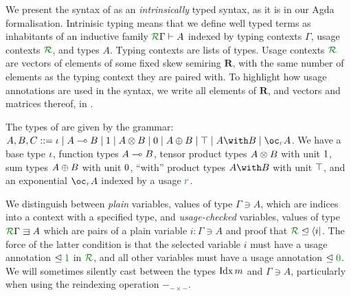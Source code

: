 \documentclass[submission,copyright,creativecommons]{eptcs}
\begin{document}
We present the syntax of \name{} as an \emph{intrinsically} typed
syntax, as it is in our Agda formalisation. Intrinisic typing means
that we define well typed terms as inhabitants of an inductive family
$\ctx\Gamma{R} \vdash A$ indexed by typing contexts $\Gamma$, usage
contexts $\resctx{R}$, and types $A$. Typing contexts are lists of
types. Usage contexts $\resctx{R}$ are vectors of elements of some
fixed skew semiring $\mathbf R$, with the same number of elements as
the typing context they are paired with. To highlight how usage
annotations are used in the syntax, we write all elements of
$\mathbf R$, and vectors and matrices thereof, in .



The types of \name{} are given by the grammar:
$ A,B,C ::= \base \mid \fun A B \mid \tensorOne \mid \tensor A B \mid \sumTZero
\mid \sumT A B \mid \withTOne \mid \withT A B \mid \excl{r} A$.
We have a base type $\iota$, function types $A \multimap B$, tensor product types
$A \otimes B$ with unit $1$, sum types $A \oplus B$ with unit
$0$, ``with'' product types $\withT A B$ with unit $\top$, and an
exponential $\excl{r} A$ indexed by a usage $\rescomment{r}$.

We distinguish between \emph{plain} variables, values of type
$\Gamma \ni A$, which are indices into a context with a specified
type, and \emph{usage-checked} variables, values of type
$\ctx{\Gamma}{R} \lvar A$ which are pairs of a plain variable
$i : \Gamma \ni A$ and proof that
$\resctx R \subres \langle i \rvert$. The force of the latter
condition is that the selected variable $i$ must have a usage
annotation $\subres \rescomment 1$ in $\resctx{R}$, and all other
variables must have a usage annotation $\subres \rescomment 0$. We
will sometimes silently cast between the types $\operatorname{Idx} m$ and
$\Gamma \ni A$, particularly when using the reindexing operation
${-}_{{-}\times{-}}$.


\end{document}
